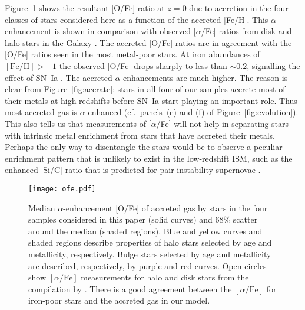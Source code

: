 \documentclass[a4paper,fleqn,usenatbib]{mnras}
\begin{document}
Figure~\ref{fig:ofe} shows the resultant [O/Fe] ratio at $z=0$ due to
accretion in the four classes of stars considered here as a function
of the accreted [Fe/H].  This $\alpha$-enhancement is shown in
comparison with observed [$\alpha$/Fe] ratios from disk and halo stars
in the Galaxy \citep{2000AJ....120.1841F, 2003MNRAS.340..304R,
  2006MNRAS.367.1329R, 2004A&A...416.1117C, 2004ApJ...617.1091S,
  2004AJ....128.1177V, 2005A&A...439..129B, 2013A&A...552A.128M,
  2014AJ....147..136R}.  The accreted [O/Fe] ratios are in agreement
with the [O/Fe] ratios seen in the most metal-poor stars.  At iron
abundances of $[\mathrm{Fe}/\mathrm{H}]>-1$ the observed [O/Fe] drops
sharply to less than $\sim 0.2$, signalling the effect of SN~Ia
\citep{1979ApJ...229.1046T}.  The accreted $\alpha$-enhancements are
much higher.  The reason is clear from Figure~\ref{fig:accrate}: stars
in all four of our samples accrete most of their metals at high
redshifts before SN~Ia start playing an important role.  Thus most
accreted gas is $\alpha$-enhanced (cf.\ panels~(e) and (f) of
Figure~\ref{fig:evolution}).  This also tells us that measurements of
[$\alpha$/Fe] will not help in separating stars with intrinsic metal
enrichment from stars that have accreted their metals.  Perhaps the
only way to disentangle the stars would be to observe a peculiar
enrichment pattern that is unlikely to exist in the low-redshift ISM,
such as the enhanced [Si/C] ratio that is predicted for
pair-instability supernovae \citep{2002ApJ...567..532H}.

\begin{figure}
  \begin{center}
    \texttt{[image: ofe.pdf]}
  \end{center}
  \caption{Median $\alpha$-enhancement [O/Fe] of accreted gas by stars
    in the four samples considered in this paper (solid curves) and
    68\% scatter around the median (shaded regions).  Blue and yellow
    curves and shaded regions describe properties of halo stars
    selected by age and metallicity, respectively.  Bulge stars
    selected by age and metallicity are described, respectively, by
    purple and red curves.  Open circles show $[\alpha/\mathrm{Fe}]$
    measurements for halo and disk stars from the compilation by
    \citet{2015ApJ...807..115S}.  There is a good agreement between
    the $[\alpha/\mathrm{Fe}]$ for iron-poor stars and the accreted
    gas in our model.}
  \label{fig:ofe}
\end{figure}
\end{document}
